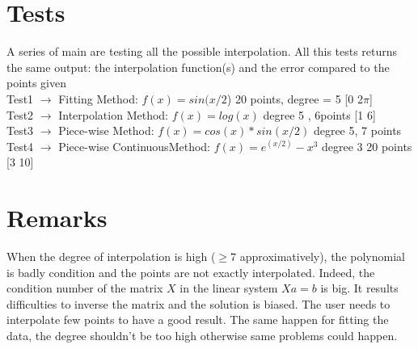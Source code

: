 \documentclass[12pt]{article}
\begin{document}
\section{Tests}
A series of main are testing all the possible interpolation. All this tests returns the same output: the interpolation function(s) and the error compared to the points given\\
Test1 $\rightarrow$ Fitting Method: $f(x) = sin(x/2$) 20 points, degree = 5 [0 2$\pi$]\\
Test2 $\rightarrow$ Interpolation Method: $f(x) = log(x)$ degree 5 , 6points [1 6]\\
Test3 $\rightarrow$ Piece-wise Method: $f(x) = cos(x)*sin(x/2)$ degree 5, 7 points\\
Test4 $\rightarrow$ Piece-wise ContinuousMethod: $f(x) = e^{(x/2)} -x^3$ degree 3 20 points [3 10]\\


\section{Remarks}
When the degree of interpolation is high ($\ge 7$ approximatively), the polynomial is badly condition and the points are not exactly interpolated. Indeed, the condition number of the matrix $X$ in the linear system $Xa=b$ is big. It results difficulties to inverse the matrix and the solution is biased. The user needs to interpolate few points to have a good result.
The same happen for fitting the data, the degree shouldn't be too high otherwise same problems could happen.



 
\end{document}
